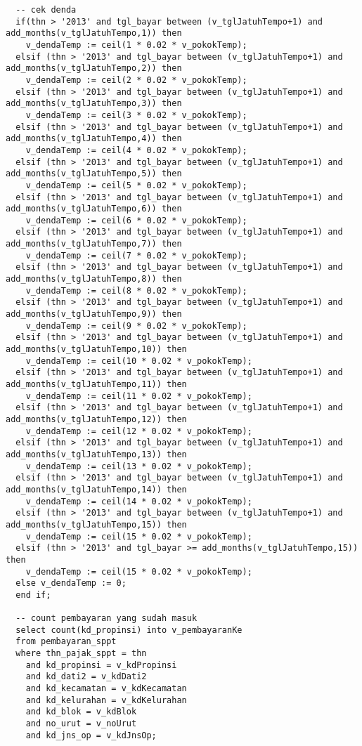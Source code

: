 \documentclass[pdftex,12pt, oneside]{article}
\begin{document}
\begin{lstlisting}
  -- cek denda
  if(thn > '2013' and tgl_bayar between (v_tglJatuhTempo+1) and add_months(v_tglJatuhTempo,1)) then
    v_dendaTemp := ceil(1 * 0.02 * v_pokokTemp);
  elsif (thn > '2013' and tgl_bayar between (v_tglJatuhTempo+1) and add_months(v_tglJatuhTempo,2)) then
    v_dendaTemp := ceil(2 * 0.02 * v_pokokTemp);
  elsif (thn > '2013' and tgl_bayar between (v_tglJatuhTempo+1) and add_months(v_tglJatuhTempo,3)) then
    v_dendaTemp := ceil(3 * 0.02 * v_pokokTemp);
  elsif (thn > '2013' and tgl_bayar between (v_tglJatuhTempo+1) and add_months(v_tglJatuhTempo,4)) then
    v_dendaTemp := ceil(4 * 0.02 * v_pokokTemp);
  elsif (thn > '2013' and tgl_bayar between (v_tglJatuhTempo+1) and add_months(v_tglJatuhTempo,5)) then
    v_dendaTemp := ceil(5 * 0.02 * v_pokokTemp);
  elsif (thn > '2013' and tgl_bayar between (v_tglJatuhTempo+1) and add_months(v_tglJatuhTempo,6)) then
    v_dendaTemp := ceil(6 * 0.02 * v_pokokTemp);
  elsif (thn > '2013' and tgl_bayar between (v_tglJatuhTempo+1) and add_months(v_tglJatuhTempo,7)) then
    v_dendaTemp := ceil(7 * 0.02 * v_pokokTemp);
  elsif (thn > '2013' and tgl_bayar between (v_tglJatuhTempo+1) and add_months(v_tglJatuhTempo,8)) then
    v_dendaTemp := ceil(8 * 0.02 * v_pokokTemp);
  elsif (thn > '2013' and tgl_bayar between (v_tglJatuhTempo+1) and add_months(v_tglJatuhTempo,9)) then
    v_dendaTemp := ceil(9 * 0.02 * v_pokokTemp);
  elsif (thn > '2013' and tgl_bayar between (v_tglJatuhTempo+1) and add_months(v_tglJatuhTempo,10)) then
    v_dendaTemp := ceil(10 * 0.02 * v_pokokTemp);
  elsif (thn > '2013' and tgl_bayar between (v_tglJatuhTempo+1) and add_months(v_tglJatuhTempo,11)) then
    v_dendaTemp := ceil(11 * 0.02 * v_pokokTemp);
  elsif (thn > '2013' and tgl_bayar between (v_tglJatuhTempo+1) and add_months(v_tglJatuhTempo,12)) then
    v_dendaTemp := ceil(12 * 0.02 * v_pokokTemp);
  elsif (thn > '2013' and tgl_bayar between (v_tglJatuhTempo+1) and add_months(v_tglJatuhTempo,13)) then
    v_dendaTemp := ceil(13 * 0.02 * v_pokokTemp);
  elsif (thn > '2013' and tgl_bayar between (v_tglJatuhTempo+1) and add_months(v_tglJatuhTempo,14)) then
    v_dendaTemp := ceil(14 * 0.02 * v_pokokTemp);
  elsif (thn > '2013' and tgl_bayar between (v_tglJatuhTempo+1) and add_months(v_tglJatuhTempo,15)) then
    v_dendaTemp := ceil(15 * 0.02 * v_pokokTemp);
  elsif (thn > '2013' and tgl_bayar >= add_months(v_tglJatuhTempo,15)) then
    v_dendaTemp := ceil(15 * 0.02 * v_pokokTemp);
  else v_dendaTemp := 0;
  end if;

  -- count pembayaran yang sudah masuk
  select count(kd_propinsi) into v_pembayaranKe
  from pembayaran_sppt
  where thn_pajak_sppt = thn
    and kd_propinsi = v_kdPropinsi
    and kd_dati2 = v_kdDati2
    and kd_kecamatan = v_kdKecamatan
    and kd_kelurahan = v_kdKelurahan
    and kd_blok = v_kdBlok
    and no_urut = v_noUrut
    and kd_jns_op = v_kdJnsOp;


\end{lstlisting}
\end{document}
